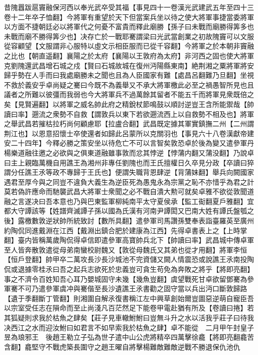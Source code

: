 昔隗囂跋扈竇融保河西以奉光武卒受其福【事見四十一卷漢光武建武五年至四十三卷十二年卒子恤翻】今將軍有重望於天下但當案兵坐以待之使大將軍事捷當委將軍以方面不捷朝廷必以將軍代之何憂不富貴而釋此廟勝【孫子曰未戰而廟勝得筭多也未戰而廟不勝得筭少也】决存亡於一戰耶騫謂梁曰光武當創業之初故隗竇可以文服從容顧望【文服謂非心服特以虛文示相臣服而已從千容翻】今將軍之於本朝非竇融之比也【朝直遥翻】襄陽之於太府【襄陽以王敦府為太府】非河西之固也使大將軍克劉隗還武昌增石城之戍【賢曰石城故城在復州沔陽縣東南】絶荆湘之粟將軍將安歸乎勢在人手而曰我處廟勝未之聞也且為人臣國家有難【處昌呂翻難乃旦翻】坐視不救於義安乎卓尚疑之騫曰今既不為義舉又不承大將軍檄此必至之禍愚智所見也且議者之所難以彼彊而我弱也今大將軍兵不過萬餘其留者不能五千而將軍見衆既倍之矣【見賢遍翻】以將軍之威名帥此府之精銳杖節鳴鼓以順討逆豈王含所能禦哉【帥讀曰率】遡流之衆勢不自救【謂敦兵以東下若欲遡流西上以自救勢不相及也】將軍之舉武昌若摧枯拉朽尚何顧慮耶【拉盧合翻】武昌既定據其軍實鎮撫二州【二州謂荆江也】以恩意招懷士卒使還者如歸此呂蒙所以克關羽也【事見六十八卷漢獻帝建安二十四年】今釋必勝之策安坐以待危亡不可以言智矣敦恐卓於後為變又遣參軍丹楊樂道融往邀之必欲與之俱東道融雖事敦而忿其悖逆【悖蒲内翻又蒲没翻】乃說卓曰主上親臨萬機自用譙王為湘州非專任劉隗也而王氏擅權日久卒見分政【卒讀曰猝謂分任譙王氶等政不專歸于王氏也】便謂失職背恩肆逆【背蒲妹翻】舉兵向闕國家遇君至厚今與之同豈不違負大義生為逆臣死為愚鬼永為宗黨之恥不亦惜乎為君之計莫若偽許應命而馳襲武昌大將軍士衆聞之必不戰自潰大勲可就矣卓雅不欲從敦聞道融之言遂决曰吾本意也乃與巴東監軍柳純南平太守夏侯承【監工䘖翻夏戶雅翻】宜都大守譚該等【姓譜齊滅譚子孫以國為氏漢有河南尹譚閎又巴南大姓有譚氏盤瓠之後】露檄數敦逆狀帥所統致討【數所具翻】遣參軍司馬讚孫雙奉表詣臺羅英至廣州約陶侃同進戴淵在江西【戴淵出鎮合肥於建康為江西】先得卓書表上之【上時掌翻】臺内皆稱萬歲陶侃得卓信即遣參軍高寶帥兵北下【帥讀曰率】武昌城中傳卓軍至人皆奔散敦遣從母弟南蠻校尉魏又【敦從母魏氏又其弟也從才用翻】將軍李恒【恒戶登翻】帥甲卒二萬攻長沙長沙城池不完資儲又闕人情震恐或說譙王氶南投陶侃或退據零桂氶曰吾之起兵志欲死於忠義豈可貪生苟免為奔敗之將乎【將即亮翻】事之不濟令百姓知吾心耳乃嬰城固守未幾【幾魚豈翻】虞望戰死甘卓欲留鄧騫為參軍騫不可乃遣參軍虞冲與騫偕至長沙遺譙王氶書勸之固守當以兵出沔口斷敦歸路【遺于季翻斷丁管翻】則湘圍自解氶復書稱江左中興草創始爾豈圖惡逆萌自寵臣吾以宗室受任志在隕命而至止尚淺凡百茫然足下能卷甲電赴猶有所及【卷讀曰捲】若其狐疑則求我於枯魚之肆矣【莊子見車轍鮒鮒曰豈無斗升之水以活我乎莊子曰待我决西江之水而迎汝鮒曰如君言不如早索我於枯魚之肆】卓不能從　二月甲午封皇子昱為琅邪王　後趙王勒立子弘為世子遣中山公虎將精卒四萬擊徐龕【將即亮翻龕苦含翻】龕堅守不戰虎築長圍守之趙王曜自將擊楊難敵難敵逆戰不勝退保仇池仇

